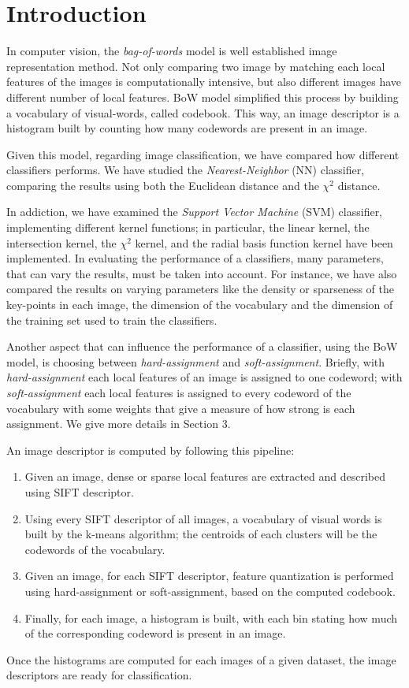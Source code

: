 \section{Introduction}

In computer vision, the \emph{bag-of-words} model is well established image representation method. Not only comparing two image by matching each local features of the images is computationally intensive, but also different images have different number of local features. BoW model simplified this process by building a vocabulary of visual-words, called codebook. This way, an image descriptor is a histogram built by counting how many codewords are present in an image.

Given this model, regarding image classification, we have compared how different classifiers performs.
We have studied the \emph{Nearest-Neighbor} (NN) classifier, comparing the results using both the Euclidean distance and the $\chi^2$ distance.

In addiction, we have examined the \emph{Support Vector Machine} (SVM) classifier, implementing different kernel functions; in particular, the linear kernel, the intersection kernel, the $\chi^2$ kernel, and the radial basis function kernel have been implemented.
In evaluating the performance of a classifiers, many parameters, that can vary the results, must be taken into account.
For instance, we have also compared the results on varying parameters like the density or sparseness of the key-points in each image, the dimension of the vocabulary and the dimension of the training set used to train the classifiers.

Another aspect that can influence the performance of a classifier, using the BoW model, is choosing between \emph{hard-assignment} and \emph{soft-assignment}. Briefly, with \emph{hard-assignment} each local features of an image is assigned to one codeword; with \emph{soft-assignment} each local features is assigned to every codeword of the vocabulary with some weights that give a measure of how strong is each assignment. We give more details in Section 3.

An image descriptor is computed by following this pipeline:
\begin{enumerate}
\item Given an image, dense or sparse local features are extracted and described using SIFT descriptor.
\item Using every SIFT descriptor of all images, a vocabulary of visual words is built by the k-means algorithm; the centroids of each clusters will be the codewords of the vocabulary.
\item Given an image, for each SIFT descriptor, feature quantization is performed using hard-assignment or soft-assignment, based on the computed codebook.
\item Finally, for each image, a histogram is built, with each bin stating how much of the corresponding codeword is present in an image.
\end{enumerate}

Once the histograms are computed for each images of a given dataset, the image descriptors are ready for classification.
